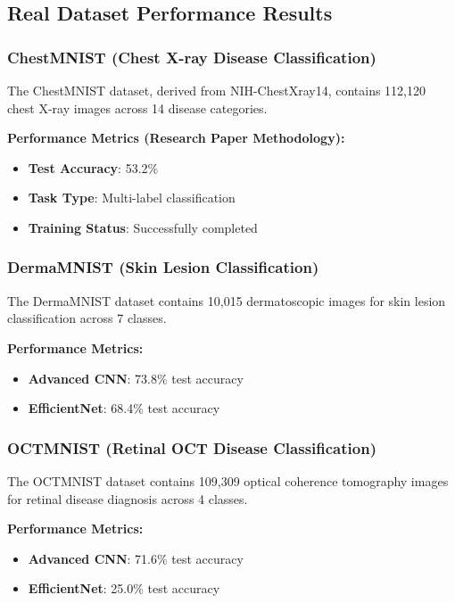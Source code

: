 \documentclass[12pt,a4paper]{article}
\begin{document}
\subsection{Real Dataset Performance Results}

\subsubsection{ChestMNIST (Chest X-ray Disease Classification)}

The ChestMNIST dataset, derived from NIH-ChestXray14, contains 112,120 chest X-ray images across 14 disease categories.

\textbf{Performance Metrics (Research Paper Methodology):}
\begin{itemize}
    \item \textbf{Test Accuracy}: 53.2\%
    \item \textbf{Task Type}: Multi-label classification
    \item \textbf{Training Status}: Successfully completed
\end{itemize}

\subsubsection{DermaMNIST (Skin Lesion Classification)}

The DermaMNIST dataset contains 10,015 dermatoscopic images for skin lesion classification across 7 classes.

\textbf{Performance Metrics:}
\begin{itemize}
    \item \textbf{Advanced CNN}: 73.8\% test accuracy
    \item \textbf{EfficientNet}: 68.4\% test accuracy
\end{itemize}

\subsubsection{OCTMNIST (Retinal OCT Disease Classification)}

The OCTMNIST dataset contains 109,309 optical coherence tomography images for retinal disease diagnosis across 4 classes.

\textbf{Performance Metrics:}
\begin{itemize}
    \item \textbf{Advanced CNN}: 71.6\% test accuracy
    \item \textbf{EfficientNet}: 25.0\% test accuracy
\end{itemize}
\end{document}
